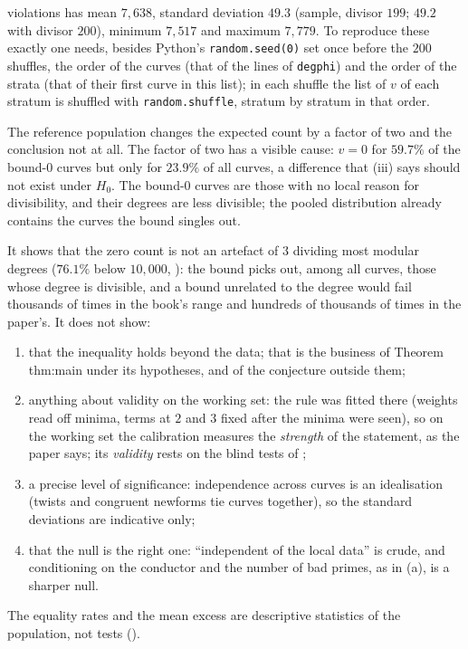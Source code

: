 \begin{sloppypar}
\begin{example}
\begin{enumerate}[label=(\alph*)]
violations has mean $7{,}638$, standard deviation $49.3$ (sample, divisor $199$; $49.2$ with divisor $200$), minimum $7{,}517$ and maximum $7{,}779$. To reproduce
these exactly one needs, besides Python's \texttt{random.seed(0)} set once before the $200$ shuffles, the order of the curves (that of the lines of
\texttt{degphi}) and the order of the strata (that of their first curve in this list); in each shuffle the list of $v$ of each stratum is shuffled with
\texttt{random.shuffle}, stratum by stratum in that order.
\end{enumerate}
The reference population changes the expected count by a factor of two and the conclusion not at all. The factor of two has a visible cause:
$v=0$ for $59.7\%$ of the bound-$0$ curves but only for $23.9\%$ of all curves, a difference that (iii) says should not exist
under $H_0$. The bound-$0$ curves are those with no local reason for divisibility, and their degrees are less divisible; the pooled distribution
already contains the curves the bound singles out.
\end{example}

\begin{remark}\label{rem:computation:calibration-reading}
It shows that the zero count is not an artefact of $3$ dividing most modular degrees ($76.1\%$ below $10{,}000$, ): the
bound picks out, among all curves, those whose degree is divisible, and a bound unrelated to the degree would fail thousands of times in the book's
range and hundreds of thousands of times in the paper's. It does not show:
\begin{enumerate}[label=(\alph*)]
\item that the inequality holds beyond the data; that is the business of Theorem thm:main under its hypotheses, and of the conjecture outside them;
\item anything about validity on the working set: the rule was fitted there (weights read off minima, terms at $2$ and $3$ fixed after the minima
were seen), so on the working set the calibration measures the \emph{strength} of the statement, as the paper says; its \emph{validity} rests on the
blind tests of ;
\item a precise level of significance: independence across curves is an idealisation (twists and congruent newforms tie curves together), so the
standard deviations are indicative only;
\item that the null is the right one: ``independent of the local data'' is crude, and conditioning on the conductor and the number of bad primes,
as in (a), is a sharper null.
\end{enumerate}
The equality rates and the mean excess are descriptive statistics of the population, not tests ().
\end{remark}


\end{sloppypar}
